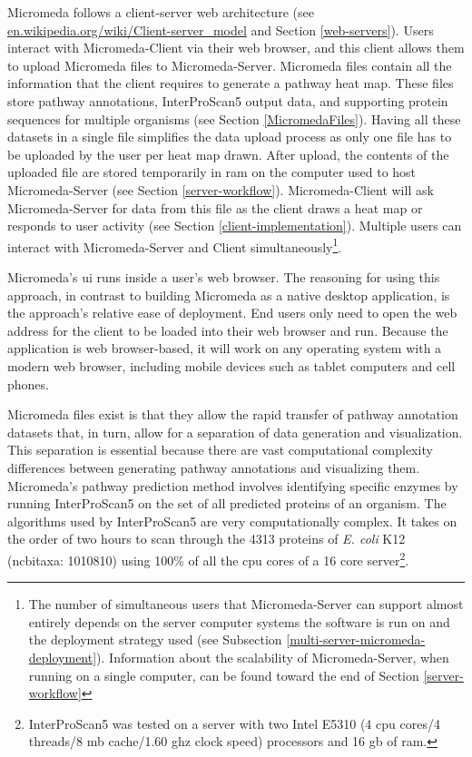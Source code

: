 Micromeda follows a client-server web architecture \cite{svobodova1985client} 
(see 
\href{http://en.wikipedia.org/wiki/Client-server_model}{en.wikipedia.org/wiki/Client-server\_model} 
and Section \ref{web-servers}). Users interact with Micromeda-Client via their 
web browser, and this client allows them to upload Micromeda files to 
Micromeda-Server. Micromeda files contain all the information that the client 
requires to generate a pathway heat map. These files store pathway annotations, 
InterProScan5 output data, and supporting protein sequences for multiple 
organisms (see Section \ref{MicromedaFiles}). Having all these datasets in a 
single file simplifies the data upload process as only one file has to be 
uploaded by the user per heat map drawn. After upload, the contents of the 
uploaded file are stored temporarily in \gls{ram} on the computer used to host 
Micromeda-Server (see Section \ref{server-workflow}). Micromeda-Client will ask 
Micromeda-Server for data from this file as the client draws a heat map or 
responds to user activity (see Section \ref{client-implementation}). Multiple 
users can interact with Micromeda-Server and Client simultaneously\footnote{The 
number of simultaneous users that Micromeda-Server can support almost entirely 
depends on the server computer systems the software is run on and the deployment 
strategy used (see Subsection \ref{multi-server-micromeda-deployment}). 
Information about the scalability of Micromeda-Server, when running on a single 
computer, can be found toward the end of Section \ref{server-workflow}}.

Micromeda's \gls{ui} runs inside a user's web browser. The reasoning for using 
this approach, in contrast to building Micromeda as a native desktop 
application, is the approach's relative ease of deployment. End users only need 
to open the web address for the client to be loaded into their web browser and 
run. Because the application is web browser-based, it will work on any operating 
system with a modern web browser, including mobile devices such as tablet 
computers and cell phones.

Micromeda files exist is that they allow the rapid transfer of pathway 
annotation datasets that, in turn, allow for a separation of data generation and 
visualization. This separation is essential because there are vast computational 
complexity differences between generating pathway annotations and visualizing 
them. Micromeda's pathway prediction method involves identifying 
specific enzymes by running InterProScan5 on the set of all predicted proteins 
of an organism. The algorithms used by InterProScan5 are very computationally 
complex. It takes on the order of two hours to scan through the 4313 proteins of 
\textit{E. coli} K12 (\gls{ncbitaxa}: 1010810) using 100\% of all the \gls{cpu} 
cores of a 16 core server\footnote{InterProScan5 was tested on a server with two 
Intel E5310 (4 \gls{cpu} cores/4 threads/8 \gls{mb} cache/1.60 \gls{ghz} clock 
speed) processors and 16 \gls{gb}  of \gls{ram}.}.

